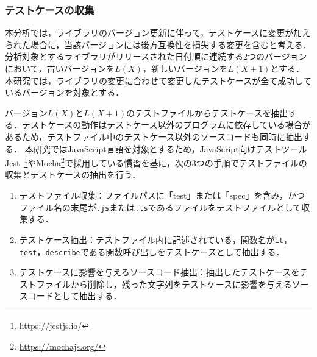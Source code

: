 \documentclass[submit]{ipsj}
\begin{document}
\subsubsection{テストケースの収集}
\label{sec:step1-1}

本分析では，ライブラリのバージョン更新に伴って，テストケースに変更が加えられた場合に，当該バージョンには後方互換性を損失する変更を含むと考える．分析対象とするライブラリがリリースされた日付順に連続する2つのバージョンにおいて，古いバージョンを$L(X)$，新しいバージョンを$L(X+1)$とする．本研究では，ライブラリの変更に合わせて変更したテストケースが全て成功しているバージョンを対象とする．

バージョン$L(X)$と$L(X+1)$のテストファイルからテストケースを抽出する．テストケースの動作はテストケース以外のプログラムに依存している場合があるため，テストファイル中のテストケース以外のソースコードも同時に抽出する．
本研究ではJavaScript言語を対象とするため，JavaScript向けテストツールJest~\footnote{\url{https://jestjs.io/}}やMocha\footnote{\url{https://mochajs.org/}}で採用している慣習を基に，次の3つの手順でテストファイルの収集とテストケースの抽出を行う．

\begin{enumerate}
  \item テストファイル収集：ファイルパスに「test」または「spec」を含み，かつファイル名の末尾が{\verb|.js|}または{\verb|.ts|}であるファイルをテストファイルとして収集する．
  \item テストケース抽出：テストファイル内に記述されている，関数名が\verb|it|，\verb|test|，\verb|describe|である関数呼び出しをテストケースとして抽出する．
  \item テストケースに影響を与えるソースコード抽出：抽出したテストケースをテストファイルから削除し，残った文字列をテストケースに影響を与えるソースコードとして抽出する．
\end{enumerate}


\end{document}
